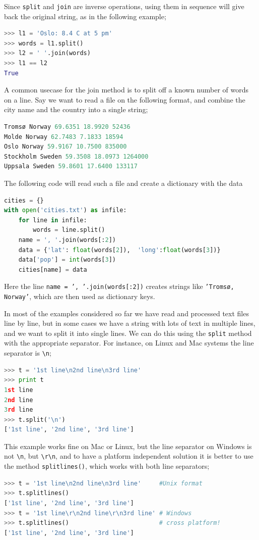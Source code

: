\documentclass[graybox,envcountchap,sectrefs,final]{svmonodo}
\begin{document}
Since \texttt{split} and \texttt{join} are inverse operations, using them in sequence will give back the original string,
as in the following example;
\begin{lstlisting}[language=Python,style=blue1]
>>> l1 = 'Oslo: 8.4 C at 5 pm'
>>> words = l1.split()
>>> l2 = ' '.join(words)
>>> l1 == l2
True
\end{lstlisting}
A common usecase for the join method is to split off a known number of words on a line. Say we want to read
a file on the following format, and combine the city name and the country into a single string;
\begin{lstlisting}[language=Python,style=gray]
Tromsø Norway 69.6351 18.9920 52436
Molde Norway 62.7483 7.1833 18594
Oslo Norway 59.9167 10.7500 835000
Stockholm Sweden 59.3508 18.0973 1264000
Uppsala Sweden 59.8601 17.6400 133117
\end{lstlisting}
The following code will read such a file and create a dictionary with the data
\begin{lstlisting}[language=Python,style=blue1]
cities = {}
with open('cities.txt') as infile:
    for line in infile:
        words = line.split()
	name = ', '.join(words[:2])
	data = {'lat': float(words[2]),  'long':float(words[3])}
	data['pop'] = int(words[3])
	cities[name] = data
\end{lstlisting}
Here the line \texttt{name = ', '.join(words[:2])} creates strings like \texttt{'Tromsø, Norway'}, which are then used as dictionary keys.

In most of the examples considered so far we have read and processed text files line by line, but in some cases we have a string with lots of text in multiple lines,
and we want to split it into single lines. We can do this using the \texttt{split} method with the appropriate separator. For instance, on Linux and Mac systems the line separator
is  \Verb!\n!;
\begin{lstlisting}[language=Python,style=blue1]
>>> t = '1st line\n2nd line\n3rd line'
>>> print t
1st line
2nd line
3rd line
>>> t.split('\n')
['1st line', '2nd line', '3rd line']
\end{lstlisting}
This example works fine on Mac or Linux, but the line separator on Windows is not \Verb!\n!, but \Verb!\r\n!,
and to have a platform independent solution
it is better to use the method \texttt{splitlines()}, which works with
both line separators;
\begin{lstlisting}[language=Python,style=blue1]
>>> t = '1st line\n2nd line\n3rd line'	   #Unix format
>>> t.splitlines()
['1st line', '2nd line', '3rd line']
>>> t = '1st line\r\n2nd line\r\n3rd line' # Windows
>>> t.splitlines()                         # cross platform!
['1st line', '2nd line', '3rd line']
\end{lstlisting}
\end{document}

